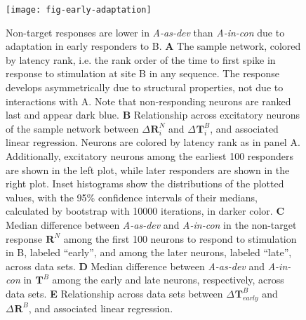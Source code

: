 \documentclass[9pt,lineno,onehalfspacing]{elife}
\newcommand{\dev}{\textit{A-as-dev}}
\newcommand{\msc}{\textit{A-in-con}}
\newcommand{\R}[3][]{{}^{#1}_{}\boldsymbol R^{#2}_{#3}}
\newcommand{\T}[3][]{{}^{#1}_{}\boldsymbol T^{#2}_{#3}}
\begin{document}
\begin{figure}
    \texttt{[image: fig-early-adaptation]}
    \caption{%
        Non-target responses are lower in \dev{} than \msc{} due to adaptation in early responders to B.
        \textbf{A} The sample network, colored by latency rank, i.e. the rank order of the time to first spike in response to stimulation at site B in any sequence. The response develops asymmetrically due to structural properties, not due to interactions with A. Note that non-responding neurons are ranked last and appear dark blue.
        \textbf{B} Relationship across excitatory neurons of the sample network between $\Delta \R{N}{i}$ and $\Delta \T{B}{i}$, and associated linear regression. Neurons are colored by latency rank as in panel A. Additionally, excitatory neurons among the earliest 100 responders are shown in the left plot, while later responders are shown in the right plot. Inset histograms show the distributions of the plotted values, with the 95\% confidence intervals of their medians, calculated by bootstrap with 10000 iterations, in darker color.
        \textbf{C} Median difference between \dev{} and \msc{} in the non-target response $\R{N}{}$ among the first 100 neurons to respond to stimulation in B, labeled ``early'', and among the later neurons, labeled ``late'', across data sets.
        \textbf{D} Median difference between \dev{} and \msc{} in $\T{B}{}$ among the early and late neurons, respectively, across data sets.
        \textbf{E} Relationship across data sets between $\Delta \T{B}{early}$ and $\Delta \R{B}{}$, and associated linear regression.
    }
    \label{fig:early-adaptation}
\end{figure}
\end{document}
